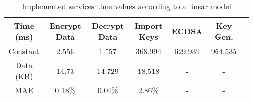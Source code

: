\begin{table}[h!]
\centering
\def\arraystretch{1.5}
\begin{tabular}{|c|c|c|c|c|c|c|}
\hline
	Time (ms) & Encrypt Data  & Decrypt Data  & Import Keys & ECDSA & Key Gen. \\ \hline
	Constant  & 2.556  & 1.557   & 368.994 & 629.932 & 964.535 \\ \hline
	Data (KB) & 14.73  & 14.729  & 18.518  & - & - \\ \hline
	MAE	  & 0.18\% & 0.04\%  & 2.86\%  & - & - \\ \hline
\end{tabular}
\caption{Implemented services time values according to a linear model}
\label{tab:services-model}
\end{table}
